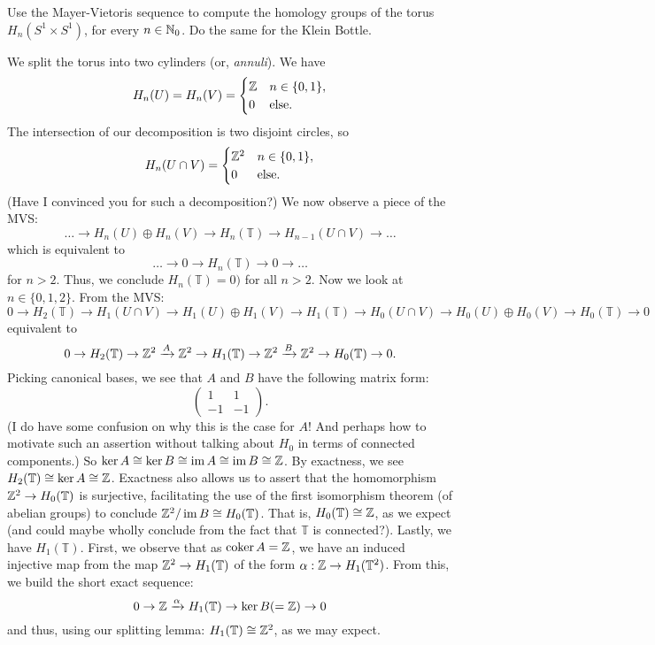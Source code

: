 \begin{questions}
  \question Use the Mayer-Vietoris sequence to compute the homology groups of the torus $H_n(S^1 \times S^1)$, for every $n \in \mathbb{N}_0$. Do the same for the Klein Bottle.
  \begin{solution}
    We split the torus into two cylinders (or, \emph{annuli}). We have
    \[H_n(U) = H_n(V) = \begin{cases}
      \mathbb{Z} & n \in \{0,1\}, \\
      0 & \text{else}.
    \end{cases}\]
    The intersection of our decomposition is two disjoint circles, so
    \[H_n(U \cap V) = \begin{cases}
      \mathbb{Z}^2 & n \in \{0,1\}, \\
      0 & \text{else}.
    \end{cases}\]
    (Have I convinced you for such a decomposition?) We now observe a piece of the MVS:
    \[ \ldots \to H_n(U) \oplus H_n(V) \to H_n(\mathbb T) \to H_{n-1}(U \cap V) \to \ldots \] 
    which is equivalent to 
    \[ \ldots \to 0 \to H_n(\mathbb T) \to 0 \to \ldots \]
    for $n > 2$. Thus, we conclude $H_n(\mathbb T) = 0)$ for all $n > 2$. Now we look at $n \in \{0, 1, 2\}$. From the MVS:
    {\scriptsize
    \[ 0 \to H_2(\mathbb T) \to H_1(U \cap V) \to H_1(U) \oplus H_1(V) \to H_1(\mathbb T) \to H_0(U \cap V) \to H_0(U) \oplus H_0(V) \to H_0(\mathbb T) \to 0 \] }equivalent to 
    \[ 0 \to H_2(\mathbb T) \to \mathbb{Z}^2 \xrightarrow{A} \mathbb{Z}^2 \to H_1(\mathbb T) \to \mathbb{Z}^2 \xrightarrow{B} \mathbb{Z}^2 \to H_0(\mathbb T) \to 0. \]
    Picking canonical bases, we see that $A$ and $B$ have the following matrix form:
    \[ \begin{pmatrix}
      1 & 1 \\ -1 & -1
    \end{pmatrix}. \]
    (I do have some confusion on why this is the case for $A$! And perhaps how to motivate such an assertion without talking about $H_0$ in terms of connected components.)
    So $\ker A \cong \ker B \cong \operatorname*{im} A \cong \operatorname*{im} B \cong \mathbb{Z}$. By exactness, we see $H_2(\mathbb T) \cong \ker A \cong \mathbb{Z}$. Exactness also allows us to assert that the homomorphism $\mathbb{Z}^2 \to H_0(\mathbb T)$ is surjective, facilitating the use of the first isomorphism theorem (of abelian groups) to conclude $\mathbb{Z}^2/\operatorname*{im} B \cong H_0(\mathbb T)$. That is, $H_0(\mathbb T) \cong \mathbb{Z}$, as we expect (and could maybe wholly conclude from the fact that $\mathbb T$ is connected?). Lastly, we have $H_1(\mathbb T)$. First, we observe that as $\operatorname*{coker} A = \mathbb{Z}$, we have an induced injective map from the map $\mathbb{Z}^2 \to H_1(\mathbb T)$ of the form $\alpha: \mathbb{Z} \to H_1(\mathbb T^2)$. From this, we build the short exact sequence:
    \[ 0 \to \mathbb{Z} \xrightarrow{\alpha} H_1(\mathbb T) \to \ker B (=\mathbb{Z}) \to 0 \]
    and thus, using our splitting lemma: $H_1(\mathbb T) \cong \mathbb{Z}^2$, as we may expect. 


\end{solution}
\end{questions}
